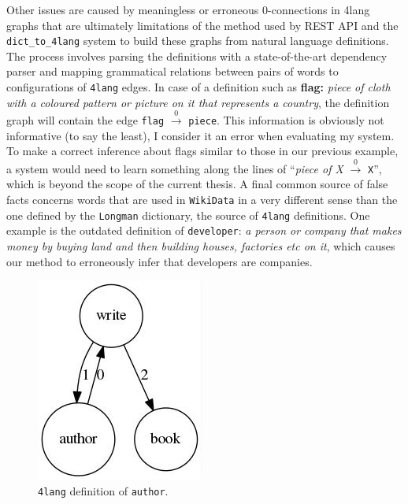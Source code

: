 Other issues are caused by meaningless or erroneous 0-connections in 4lang graphs
that are ultimately limitations of the method used by REST API and the \texttt{dict\_to\_4lang}
system to build these graphs from natural language definitions. The process involves parsing
the definitions with a state-of-the-art dependency parser and mapping grammatical
relations between pairs of words to configurations of \texttt{4lang} edges.
In case of a definition such as \textbf{flag:}
\textit{piece of cloth with a coloured pattern or picture on it that represents
	a country}, the definition graph will contain the edge
\texttt{flag} $\xrightarrow0$ \texttt{piece}. This information
is obviously not informative (to say the least), I consider it an error
when evaluating my system.
To make a correct inference about flags similar to those in our previous example,
a system would need to learn something along the lines of
``\textit{piece of X} $\xrightarrow0$ \texttt{X}'', which is beyond the scope of
the current thesis. 
A final common source of false facts concerns words that are used in \texttt{WikiData}
in a very different sense than the one defined by the \texttt{Longman} dictionary, the source
of \texttt{4lang} definitions. One example is the outdated definition of
\texttt{developer}: \textit{a person or company that makes money by buying land
	and then building houses, factories etc on it}, which causes our method to erroneously
infer that developers are companies.

\begin{figure}
	\centering
	\includegraphics[scale=0.5]{figures/author.jpg}
	\caption{\texttt{4lang} definition of \texttt{author}.}
	\label{fig:author}
\end{figure}

